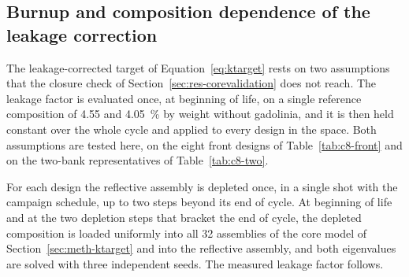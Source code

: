 %
%
%

\subsection{Burnup and composition dependence of the leakage
correction}
\label{sec:res-kt-burnup}

The leakage-corrected target of Equation~\eqref{eq:ktarget} rests on
two assumptions that the closure check of
Section~\ref{sec:res-corevalidation} does not reach. The leakage
factor is evaluated once, at beginning of life, on a single reference
composition of \num{4.55} and \SI{4.05}{\percent} by weight without
gadolinia, and it is then held constant over the whole cycle and
applied to every design in the space. Both assumptions are tested
here, on the eight front designs of Table~\ref{tab:c8-front} and on
the two-bank representatives of Table~\ref{tab:c8-two}.

For each design the reflective assembly is depleted once, in a single
shot with the campaign schedule, up to two steps beyond its end of
cycle. At beginning of life and at the two depletion steps that
bracket the end of cycle, the depleted composition is loaded uniformly
into all \num{32} assemblies of the core model of
Section~\ref{sec:meth-ktarget} and into the reflective assembly, and
both eigenvalues are solved with three independent seeds. The measured
leakage factor follows.


